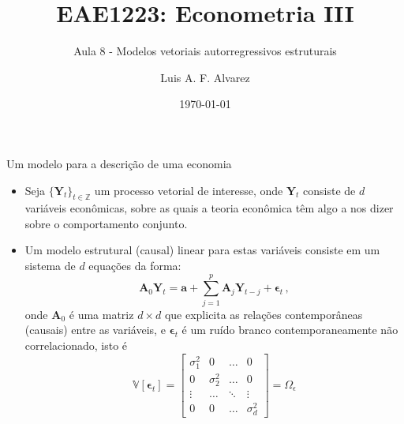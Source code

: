 \documentclass[11pt]{beamer}
\author{Luis A. F. Alvarez}
\title{EAE1223: Econometria III}
\subtitle{Aula 8 - Modelos vetoriais autorregressivos estruturais}
\date{\today}
\begin{document}
\begin{frame}[plain]
	\maketitle
\end{frame}

\begin{frame}{Um modelo para a descrição de uma economia}
	\begin{itemize}
		\item 	Seja $\{ \boldsymbol{Y}_t\}_{t\in \mathbb{Z}}$ um processo vetorial de interesse, onde $\boldsymbol{Y}_t$ consiste de $d$ variáveis econômicas, sobre as quais a teoria econômica têm algo a nos dizer sobre o comportamento conjunto.
		\item Um {\color{blue}modelo estrutural (causal) linear} para estas variáveis consiste em um sistema de $d$ equações da forma:
		\begin{equation} \label{eq_struct}
			\boldsymbol{A}_0 \boldsymbol{Y}_t = \boldsymbol{a} + \sum_{j=1}^p\boldsymbol{A}_j \boldsymbol{Y}_{t-j} + \boldsymbol{\epsilon}_t\, ,
		\end{equation}
		onde $\boldsymbol{A}_0$ é uma matriz $d \times d$ que explicita as relações contemporâneas (causais) entre as variáveis, e $\boldsymbol{\epsilon}_t$ é um ruído branco {\color{blue}contemporaneamente não correlacionado}, isto é $$ \mathbb{V}[\boldsymbol{\epsilon}_t] = \begin{bmatrix}
			\sigma_{1}^2 & 0 & \ldots & 0 \\
			0 & \sigma^2_2 & \ldots & 0 \\
			\vdots & \ldots & \ddots & \vdots \\
			0 & 0 & \ldots & \sigma^2_d
		\end{bmatrix}= \Omega_\epsilon $$
		\end{itemize}


\end{frame}
\end{document}
